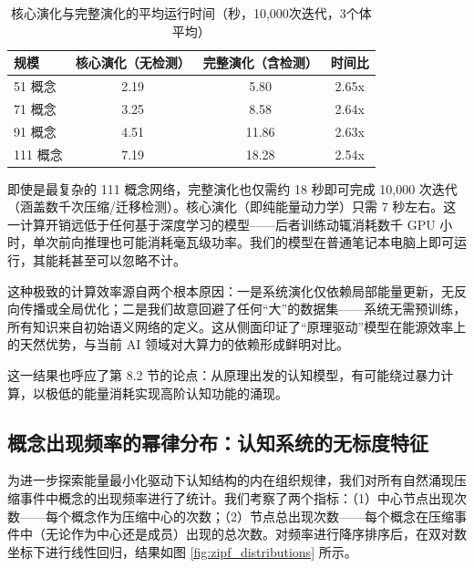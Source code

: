 \documentclass[12pt,a4paper]{article}
\begin{document}
\begin{table}[H]
\centering
\caption{核心演化与完整演化的平均运行时间（秒，10,000次迭代，3个体平均）}
\label{tab:time_comparison}
\begin{tabular}{lccc}
\toprule
\textbf{规模} & \textbf{核心演化（无检测）} & \textbf{完整演化（含检测）} & \textbf{时间比} \\
\midrule
51 概念 & 2.19 & 5.80 & 2.65x \\
71 概念 & 3.25 & 8.58 & 2.64x \\
91 概念 & 4.51 & 11.86 & 2.63x \\
111 概念 & 7.19 & 18.28 & 2.54x \\
\bottomrule
\end{tabular}
\end{table}

即使是最复杂的 111 概念网络，完整演化也仅需约 18 秒即可完成 10,000 次迭代（涵盖数千次压缩/迁移检测）。核心演化（即纯能量动力学）只需 7 秒左右。这一计算开销远低于任何基于深度学习的模型——后者训练动辄消耗数千 GPU 小时，单次前向推理也可能消耗毫瓦级功率。我们的模型在普通笔记本电脑上即可运行，其能耗甚至可以忽略不计。

这种极致的计算效率源自两个根本原因：一是系统演化仅依赖局部能量更新，无反向传播或全局优化；二是我们故意回避了任何“大”的数据集——系统无需预训练，所有知识来自初始语义网络的定义。这从侧面印证了“原理驱动”模型在能源效率上的天然优势，与当前 AI 领域对大算力的依赖形成鲜明对比。

这一结果也呼应了第 8.2 节的论点：从原理出发的认知模型，有可能绕过暴力计算，以极低的能量消耗实现高阶认知功能的涌现。

\subsection{概念出现频率的幂律分布：认知系统的无标度特征}

为进一步探索能量最小化驱动下认知结构的内在组织规律，我们对所有自然涌现压缩事件中概念的出现频率进行了统计。我们考察了两个指标：（1）中心节点出现次数——每个概念作为压缩中心的次数；（2）节点总出现次数——每个概念在压缩事件中（无论作为中心还是成员）出现的总次数。对频率进行降序排序后，在双对数坐标下进行线性回归，结果如图 \ref{fig:zipf_distributions} 所示。
\end{document}
